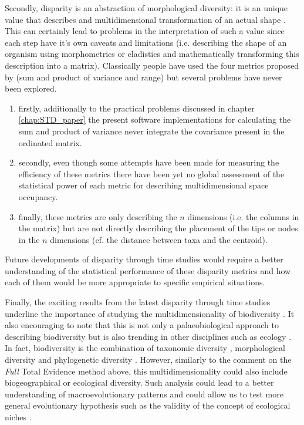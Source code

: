 Secondly, disparity is an abstraction of morphological diversity: it is an unique value that describes and multidimensional transformation of an actual shape \citep{Wills1994,foote1997evolution}.
This can certainly lead to problems in the interpretation of such a value since each step have it's own caveats and limitations (i.e. describing the shape of an organism using morphometrics or cladistics and mathematically transforming this description into a matrix).
Classically people have used the four metrics proposed by \cite{Wills1994} (sum and product of variance and range) but several problems have never been explored.
\begin{enumerate}
\item firstly, additionally to the practical problems discussed in chapter \ref{chap:STD_paper} the present software implementations for calculating the sum and product of variance never integrate the covariance present in the ordinated matrix.
\item secondly, even though some attempts have been made for measuring the efficiency of these metrics \citep{Ciampaglio2001} there have been yet no global assessment of the statistical power of each metric for describing multidimensional space occupancy.
\item finally, these metrics are only describing the $n$ dimensions (i.e. the columns in the matrix) but are not directly describing the placement of the tips or nodes in the $n$ dimensions (cf. the distance between taxa and the centroid).
\end{enumerate}
Future developments of disparity through time studies would require a better understanding of the statistical performance of these disparity metrics and how each of them would be more appropriate to specific empirical situations.

Finally, the exciting results from the latest disparity through time studies underline the importance of studying the multidimensionality of biodiversity \citep[cf. just taxonomic richness;][]{Butler2012,brusattedinosaur2012,toljagictriassic-jurassic2013,brusattegradual2014,bensonfaunal2014,Claddis,Close2015}.
It also encouraging to note that this is not only a palaeobiological approach to describing biodiversity but is also trending in other disciplines such as ecology \citep{DonohueDim}.
In fact, biodiversity is the combination of taxonomic diversity \citep[e.g.][]{Stadler12042011}, morphological diversity \citep[from cladistics or morphometrics;][]{hetherington2015cladistic} and phylogenetic diversity \citep[e.g. the evolutionary rates regimes;][]{Close2015}.
However, similarly to the comment on the \textit{Full} Total Evidence method above, this multidimensionality could also include biogeographical or ecological diversity.
Such analysis could lead to a better understanding of macroevolutionary patterns and could allow us to test more general evolutionary hypothesis such as the validity of the concept of ecological niches \citep{pearmanniche2008}.

